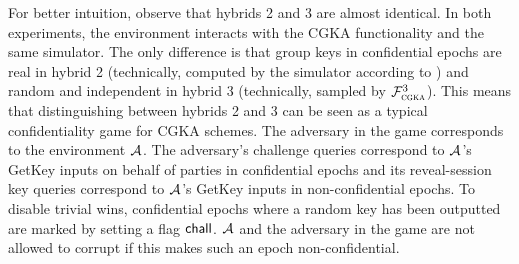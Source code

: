 For better intuition, observe that hybrids 2 and 3 are almost identical. In both experiments, the environment interacts with the CGKA functionality and the same simulator. The only difference is that group keys in confidential epochs are real in hybrid 2 (technically, computed by the simulator according to \saik) and random and independent in hybrid 3 (technically, sampled by $\mathcal{F}_{\normalfont\textsc{cgka}}^3$).
This means that distinguishing between hybrids 2 and 3 can be seen as a typical confidentiality game for CGKA schemes. The adversary in the game corresponds to the environment $\mathcal{A}_{\relax}$. The adversary's challenge queries correspond to $\mathcal{A}_{\relax}$'s GetKey inputs on behalf of parties in confidential epochs and its reveal-session key queries correspond to $\mathcal{A}_{\relax}$'s GetKey inputs in non-confidential epochs. To disable trivial wins, confidential epochs where a random key has been outputted are marked by setting a flag $\mathsf{chall}$. $\mathcal{A}_{\relax}$ and the adversary in the game are not allowed to corrupt if this makes such an epoch non-confidential.

%

